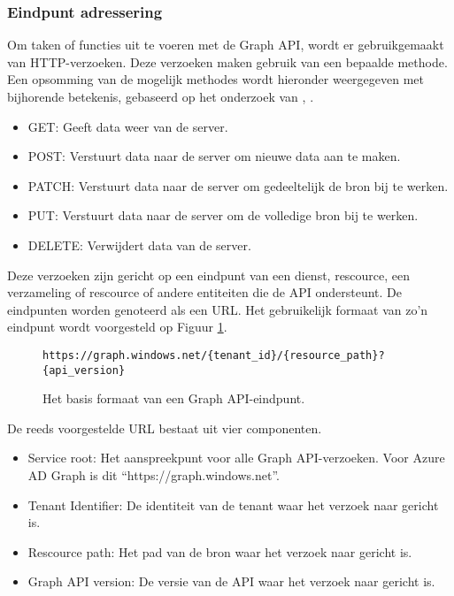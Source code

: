 \subsubsection{Eindpunt adressering}


Om taken of functies uit te voeren met de Graph \ac{API}, wordt er gebruikgemaakt van \ac{HTTP}-verzoeken. Deze verzoeken maken gebruik van een bepaalde methode. Een opsomming van de mogelijk methodes wordt hieronder weergegeven met bijhorende betekenis, gebaseerd op het onderzoek van \textcite{Fielding1999}, \textcite{Dusseault2010}.

\begin{itemize}
    \item GET: Geeft data weer van de server.
    \item POST: Verstuurt data naar de server om nieuwe data aan te maken.
    \item PATCH: Verstuurt data naar de server om gedeeltelijk de bron bij te werken.
    \item PUT: Verstuurt data naar de server om de volledige bron bij te werken.
    \item DELETE: Verwijdert data van de server.
\end{itemize}

Deze verzoeken zijn gericht op een eindpunt van een dienst, rescource, een verzameling of rescource of andere entiteiten die de \ac{API} ondersteunt. De eindpunten worden genoteerd als een \ac{URL}. Het gebruikelijk formaat van zo'n eindpunt wordt voorgesteld op Figuur \ref{bfe}. \\

\begin{figure}[h]
    \footnotesize\begin{verbatim}https://graph.windows.net/{tenant_id}/{resource_path}?{api_version}
    \end{verbatim}    
    \caption[Basis formaat Graph API-eindpunt]{Het basis formaat van een Graph \ac{API}-eindpunt.}
    \label{bfe}
\end{figure}

De reeds voorgestelde \ac{URL} bestaat uit vier componenten.

\begin{itemize}
    \item Service root: Het aanspreekpunt voor alle Graph \ac{API}-verzoeken. Voor Azure \ac{AD} Graph is dit “https://graph.windows.net”.
    \item Tenant Identifier: De identiteit van de tenant waar het verzoek naar gericht is.
    \item Rescource path: Het pad van de bron waar het verzoek naar gericht is.
    \item Graph \ac{API} version: De versie van de \ac{API} waar het verzoek naar gericht is.
\end{itemize}

